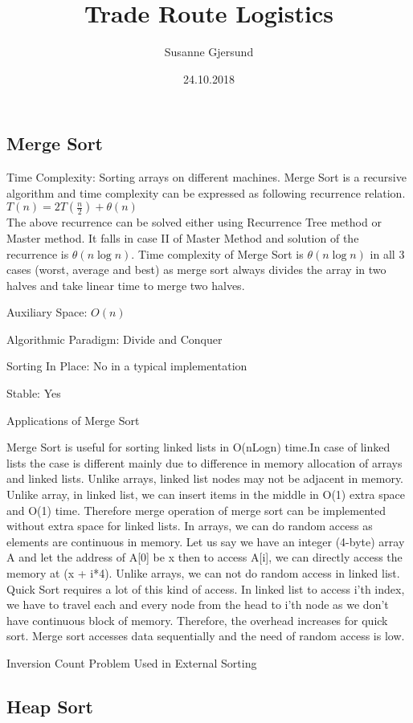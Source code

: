 \documentclass{article}
\title{Trade Route Logistics}
\author{Susanne Gjersund\\
}
\date{24.10.2018}
\begin{document}
\subsection{Merge Sort}

Time Complexity: Sorting arrays on different machines. Merge Sort is a recursive algorithm and time complexity can be expressed as following recurrence relation. \\
$T(n) = 2T(\frac{n}{2}) + \theta(n)$ \\
The above recurrence can be solved either using Recurrence Tree method or Master method. It falls in case II of Master Method and solution of the recurrence is $\theta(n\log n)$.
Time complexity of Merge Sort is $\theta(n\log n)$ in all 3 cases (worst, average and best) as merge sort always divides the array in two halves and take linear time to merge two halves.

Auxiliary Space: $O(n)$

Algorithmic Paradigm: Divide and Conquer

Sorting In Place: No in a typical implementation

Stable: Yes

Applications of Merge Sort

Merge Sort is useful for sorting linked lists in O(nLogn) time.In case of linked lists the case is different mainly due to difference in memory allocation of arrays and linked lists. Unlike arrays, linked list nodes may not be adjacent in memory. Unlike array, in linked list, we can insert items in the middle in O(1) extra space and O(1) time. Therefore merge operation of merge sort can be implemented without extra space for linked lists.
In arrays, we can do random access as elements are continuous in memory. Let us say we have an integer (4-byte) array A and let the address of A[0] be x then to access A[i], we can directly access the memory at (x + i*4). Unlike arrays, we can not do random access in linked list. Quick Sort requires a lot of this kind of access. In linked list to access i’th index, we have to travel each and every node from the head to i’th node as we don’t have continuous block of memory. Therefore, the overhead increases for quick sort. Merge sort accesses data sequentially and the need of random access is low.

Inversion Count Problem
Used in External Sorting


\subsection{Heap Sort}
\end{document}
